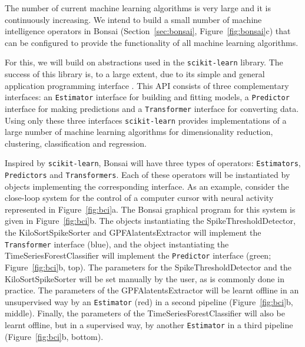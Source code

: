 The number of current machine learning algorithms is very large and it is
continuously increasing. We intend to build a small number of machine
intelligence operators in Bonsai (Section~\ref{sec:bonsai},
Figure~\ref{fig:bonsai}c) that can be configured to provide the functionality
of all machine learning algorithms.

For this, we will build on abstractions used in the \texttt{scikit-learn}
library. The success of this library is, to a large extent, due to its simple
and general application programming interface \citep[API;][]{buitinckEtAl13}.
%
This API consists of three complementary interfaces: an \texttt{Estimator}
interface for building and fitting models, a \texttt{Predictor} interface for
making predictions and a \texttt{Transformer} interface for converting data.
%
Using only these three interfaces \texttt{scikit-learn} provides
implementations of a large number of machine learning algorithms for
dimensionality reduction, clustering, classification and regression.

Inspired by \texttt{scikit-learn}, Bonsai will have three types of operators:
\texttt{Estimators}, \texttt{Predictors} and \texttt{Transformers}. Each of
these operators will be instantiated by objects implementing the corresponding
interface.
%
As an example, consider the close-loop system for the control of a computer
cursor with neural activity represented in Figure~\ref{fig:bci}a. The Bonsai
graphical program for this system is given in Figure~\ref{fig:bci}b. The
objects instantiating the SpikeThresholdDetector, the KiloSortSpikeSorter and
GPFAlatentsExtractor will implement the \texttt{Transformer} interface (blue),
and the object instantiating the TimeSeriesForestClassifier will implement the
\texttt{Predictor} interface (green; Figure~\ref{fig:bci}b, top).
%
The parameters for the SpikeThresholdDetector and the KiloSortSpikeSorter will
be set manually by the user, as is commonly done in practice. The parameters of
the GPFAlatentsExtractor will be learnt offline in an unsupervised way by an
\texttt{Estimator} (red) in a second pipeline (Figure~\ref{fig:bci}b, middle).
Finally, the parameters of the TimeSeriesForestClassifier will also be learnt
offline, but in a supervised way, by another \texttt{Estimator} in a third
pipeline (Figure~\ref{fig:bci}b, bottom).

